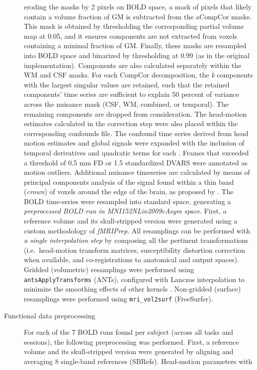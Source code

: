 \documentclass[
]{article}
\begin{document}
\begin{description}
eroding the masks by 2 pixels on BOLD space, a mask of pixels that
likely contain a volume fraction of GM is subtracted from the aCompCor
masks. This mask is obtained by thresholding the corresponding partial
volume map at 0.05, and it ensures components are not extracted from
voxels containing a minimal fraction of GM. Finally, these masks are
resampled into BOLD space and binarized by thresholding at 0.99 (as in
the original implementation). Components are also calculated separately
within the WM and CSF masks. For each CompCor decomposition, the
\emph{k} components with the largest singular values are retained, such
that the retained components' time series are sufficient to explain 50
percent of variance across the nuisance mask (CSF, WM, combined, or
temporal). The remaining components are dropped from consideration. The
head-motion estimates calculated in the correction step were also placed
within the corresponding confounds file. The confound time series
derived from head motion estimates and global signals were expanded with
the inclusion of temporal derivatives and quadratic terms for each
\citep{confounds_satterthwaite_2013}. Frames that exceeded a threshold
of 0.5 mm FD or 1.5 standardized DVARS were annotated as motion
outliers. Additional nuisance timeseries are calculated by means of
principal components analysis of the signal found within a thin band
(\emph{crown}) of voxels around the edge of the brain, as proposed by
\citep{patriat_improved_2017}. The BOLD time-series were resampled into
standard space, generating a \emph{preprocessed BOLD run in
MNI152NLin2009cAsym space}. First, a reference volume and its
skull-stripped version were generated using a custom methodology of
\emph{fMRIPrep}. All resamplings can be performed with \emph{a single
interpolation step} by composing all the pertinent transformations
(i.e.~head-motion transform matrices, susceptibility distortion
correction when available, and co-registrations to anatomical and output
spaces). Gridded (volumetric) resamplings were performed using
\texttt{antsApplyTransforms} (ANTs), configured with Lanczos
interpolation to minimize the smoothing effects of other kernels
\citep{lanczos}. Non-gridded (surface) resamplings were performed using
\texttt{mri\_vol2surf} (FreeSurfer).
\item[Functional data preprocessing]
For each of the 7 BOLD runs found per subject (across all tasks and
sessions), the following preprocessing was performed. First, a reference
volume and its skull-stripped version were generated by aligning and
averaging 8 single-band references (SBRefs). Head-motion parameters with

\end{description}
\end{document}
